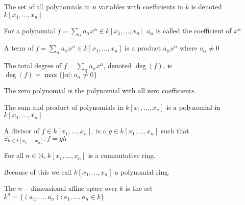                 The set of all polynomials in $n$ variables with coefficients in
                $k$ is denoted $k[x_1,\hdots ,x_n]$
                \begin{definition}
                    For a polynomial
                    $f=\sum_{\alpha}a_{\alpha}x^{\alpha}\in{k}[x_1,\hdots ,x_n]$
                    $a_\alpha$ is called the coefficient of $x^{\alpha}$
                \end{definition}
                \begin{definition}
                    A term of
                    $f=\sum_{\alpha}a_{\alpha}x^{\alpha}%
                       \in k[x_1,\hdots ,x_n]$ is a product
                    $a_{\alpha}x^{\alpha}$ where
                    $a_{\alpha}\ne{0}$
                \end{definition}
                \begin{definition}
                    The total degree of
                    $f=\sum_{\alpha}a_\alpha x^\alpha$,
                    denoted $\deg(f)$, is
                    $\deg(f)=\max\{|\alpha|:a_\alpha\ne{0}\}$
                \end{definition}
                \begin{definition}
                    The zero polynomial is the
                    polynomial with all zero coefficients.
                \end{definition}
                \begin{theorem}
                    The sum and product of polynomials in
                    $k[x_1,\hdots ,x_n]$ is a polynomial
                    in $k[x_1,\hdots,x_n]$
                \end{theorem}
                \begin{definition}
                    A divisor of $f\in k[x_{1},\hdots,x_{n}]$,
                    is a $g\in k[x_{1},\hdots,x_{n}]$ such that
                    $\exists_{h\in k[x_{1},\hdots,x_{n}]}:f=gh$
                \end{definition}
                \begin{theorem}
                    For all $n\in\mathbb{N}$,
                    $k[x_1,\hdots ,x_n]$ is a commutative ring.
                \end{theorem}
                Because of this we call $k[x_1,\hdots ,x_n]$
                a polynomial ring.
                \begin{definition}
                    The $n-$dimensional affine space over $k$ is the set
                    $k^{n}=\{(a_1,\hdots,a_n):a_1,\hdots,a_n \in k\}$
                \end{definition}
